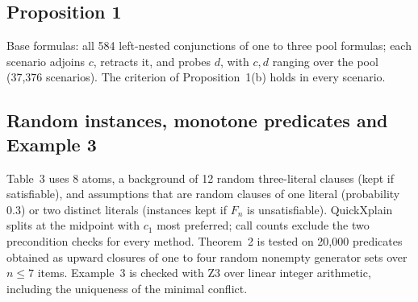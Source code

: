 \documentclass[11pt,reqno]{amsart}
\theoremstyle{plain}
\theoremstyle{definition}
\begin{document}
\subsection{Proposition 1}
Base formulas: all 584 left-nested conjunctions of one to three pool formulas; each
scenario adjoins $c$, retracts it, and probes $d$, with $c,d$ ranging over the pool
(37{,}376 scenarios). The criterion of Proposition~1(b) holds in every scenario.

\subsection{Random instances, monotone predicates and Example 3}
Table~3 uses 8 atoms, a background of 12 random three-literal clauses (kept if
satisfiable), and assumptions that are random clauses of one literal (probability
0.3) or two distinct literals (instances kept if $F_n$ is unsatisfiable).
QuickXplain splits at the midpoint with $c_1$ most preferred; call counts exclude
the two precondition checks for every method. Theorem~2 is tested on 20{,}000
predicates obtained as upward closures of one to four random nonempty generator sets
over $n\le7$ items. Example~3 is checked with Z3 over linear integer arithmetic,
including the uniqueness of the minimal conflict.
\end{document}

